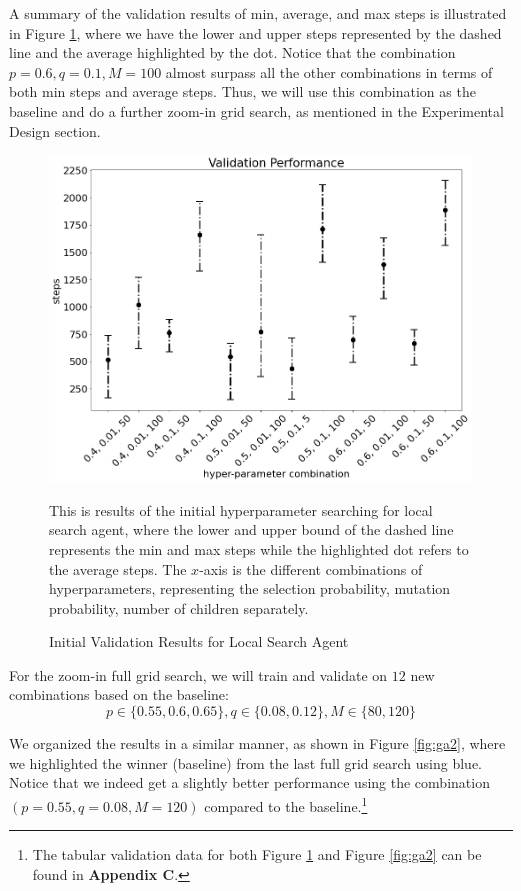 \documentclass[letterpaper]{article} %
\begin{document}
\begin{itemize}
A summary of the validation results of min, average, and max steps is illustrated in Figure \ref{fig:ga1}, where we have the lower and upper steps represented by the dashed line and the average highlighted by the dot. Notice that the combination ${p = 0.6, q = 0.1, M = 100}$ almost surpass all the other combinations in terms of both min steps and average steps. Thus, we will use this combination as the baseline and do a further zoom-in grid search, as mentioned in the Experimental Design section.
\begin{figure}[h!]
    \centering
    \includegraphics[width=0.9\linewidth]{figures/GA1}
    \caption{Initial Validation Results for Local Search Agent}
    \medskip
    \footnotesize
    This is results of the initial hyperparameter searching for local search agent, where the lower and upper bound of the dashed line represents the min and max steps while the highlighted dot refers to the average steps. The $x$-axis is the different combinations of hyperparameters, representing the selection probability, mutation probability, number of children separately.
    \label{fig:ga1}
  \end{figure}
  
  For the zoom-in full grid search, we will train and validate on $12$ new combinations based on the baseline:  
  \[
  p\in\{0.55,0.6,0.65\}, q \in \{0.08, 0.12\}, M \in \{80, 120\}
  \] 


  We organized the results in a similar manner, as shown in Figure \ref{fig:ga2}, where we highlighted the winner (baseline) from the last full grid search using blue. Notice that we indeed get a slightly better performance using the combination $(p=0.55,q=0.08,M=120)$ compared to the baseline.\footnote{The tabular validation data for both Figure \ref{fig:ga1} and Figure \ref{fig:ga2} can be found in \textbf{Appendix C}.}
  

\end{itemize}
\end{document}
